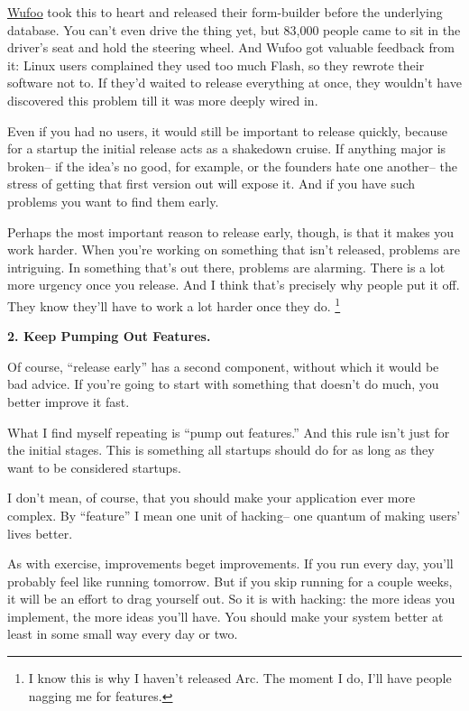 \documentclass[12pt]{book}
\begin{document}
\href{http://wufoo.com}{Wufoo} took this to heart and released their
form-builder before the underlying database. You can't even drive the
thing yet, but 83,000 people came to sit in the driver's seat and hold
the steering wheel. And Wufoo got valuable feedback from it: Linux users
complained they used too much Flash, so they rewrote their software not
to. If they'd waited to release everything at once, they wouldn't have
discovered this problem till it was more deeply wired in.

Even if you had no users, it would still be important to release
quickly, because for a startup the initial release acts as a shakedown
cruise. If anything major is broken-- if the idea's no good, for
example, or the founders hate one another-- the stress of getting that
first version out will expose it. And if you have such problems you want
to find them early.

Perhaps the most important reason to release early, though, is that it
makes you work harder. When you're working on something that isn't
released, problems are intriguing. In something that's out there,
problems are alarming. There is a lot more urgency once you release. And
I think that's precisely why people put it off. They know they'll have
to work a lot harder once they do. \footnote{I know this is why I haven't released Arc. The moment I do, I'll
have people nagging me for features.}

\textbf{2. Keep Pumping Out Features.}

Of course, ``release early'' has a second component, without which it
would be bad advice. If you're going to start with something that
doesn't do much, you better improve it fast.

What I find myself repeating is ``pump out features.'' And this rule
isn't just for the initial stages. This is something all startups should
do for as long as they want to be considered startups.

I don't mean, of course, that you should make your application ever more
complex. By ``feature'' I mean one unit of hacking-- one quantum of
making users' lives better.

As with exercise, improvements beget improvements. If you run every day,
you'll probably feel like running tomorrow. But if you skip running for
a couple weeks, it will be an effort to drag yourself out. So it is with
hacking: the more ideas you implement, the more ideas you'll have. You
should make your system better at least in some small way every day or
two.
\end{document}

